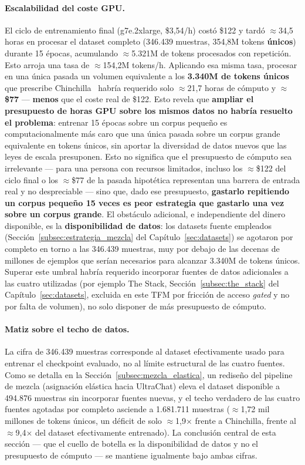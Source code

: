 \paragraph{Escalabilidad del coste GPU.} El ciclo de entrenamiento final (g7e.2xlarge, \$3,54/h) costó \$122 y tardó $\approx$34,5 horas en procesar el dataset completo (346.439 muestras, 354,8M tokens \textbf{únicos}) durante 15 épocas, acumulando $\approx$5.321M de tokens procesados con repetición. Esto arroja una tasa de $\approx$154,2M tokens/h. Aplicando esa misma tasa, procesar en una única pasada un volumen equivalente a los \textbf{3.340M de tokens únicos} que prescribe Chinchilla~\cite{hoffmann2022chinchilla} habría requerido solo $\approx$21,7 horas de cómputo y $\approx$\textbf{\$77} --- \textbf{menos} que el coste real de \$122. Esto revela que \textbf{ampliar el presupuesto de horas GPU sobre los mismos datos no habría resuelto el problema}: entrenar 15 épocas sobre un corpus pequeño es computacionalmente más caro que una única pasada sobre un corpus grande equivalente en tokens únicos, sin aportar la diversidad de datos nuevos que las leyes de escala presuponen. Esto no significa que el presupuesto de cómputo sea irrelevante --- para una persona con recursos limitados, incluso los $\approx$\$122 del ciclo final o los $\approx$\$77 de la pasada hipotética representan una barrera de entrada real y no despreciable --- sino que, dado ese presupuesto, \textbf{gastarlo repitiendo un corpus pequeño 15 veces es peor estrategia que gastarlo una vez sobre un corpus grande}. El obstáculo adicional, e independiente del dinero disponible, es la \textbf{disponibilidad de datos}: los datasets fuente empleados (Sección~\ref{subsec:estrategia_mezcla} del Capítulo~\ref{sec:datasets}) se agotaron por completo en torno a las 346.439 muestras, muy por debajo de las decenas de millones de ejemplos que serían necesarios para alcanzar 3.340M de tokens únicos. Superar este umbral habría requerido incorporar fuentes de datos adicionales a las cuatro utilizadas (por ejemplo The Stack, Sección~\ref{subsec:the_stack} del Capítulo~\ref{sec:datasets}, excluida en este TFM por fricción de acceso \textit{gated} y no por falta de volumen), no solo disponer de más presupuesto de cómputo.

\paragraph{Matiz sobre el techo de datos.} La cifra de 346.439 muestras corresponde al dataset efectivamente usado para entrenar el checkpoint evaluado, no al límite estructural de las cuatro fuentes. Como se detalla en la Sección~\ref{subsec:mezcla_elastica}, un rediseño del pipeline de mezcla (asignación elástica hacia UltraChat) eleva el dataset disponible a 494.876 muestras sin incorporar fuentes nuevas, y el techo verdadero de las cuatro fuentes agotadas por completo asciende a 1.681.711 muestras ($\approx$1,72 mil millones de tokens únicos, un déficit de solo $\approx$1,9$\times$ frente a Chinchilla, frente al $\approx$9,4$\times$ del dataset efectivamente entrenado). La conclusión central de esta sección --- que el cuello de botella es la disponibilidad de datos y no el presupuesto de cómputo --- se mantiene igualmente bajo ambas cifras.
